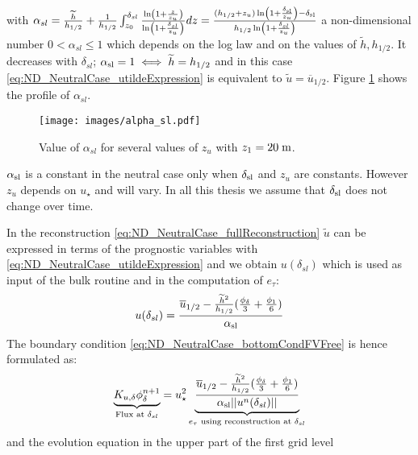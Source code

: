 with $\alpha_{sl} =
\frac{\widetilde{h}}{{h_{1/2}}} + \frac{1}{{h_{1/2}}}\int_{z_0}^{\delta_{sl}}
\frac{\ln(1+\frac{z}{z_{u}})}{\ln(1+\frac{\delta_{sl}}{z_{u}})}dz
= \frac{(h_{1/2} + z_{u})
\ln(1+\frac{\delta_{\rm sl}}{z_{u}}) - \delta_{\rm sl}}{
	h_{1/2}\ln(1+\frac{\delta_{sl}}{z_{u}})}$ a non-dimensional
number $0 < \alpha_{sl} \leq 1$ which depends on the log law and
on the values of $\widetilde{h}, h_{1/2}$. It decreases with
$\delta_{sl}$; $\alpha_{\rm sl} = 1 \iff \widetilde{h}=h_{1/2}$
and in this case \eqref{eq:ND_NeutralCase_utildeExpression} is
equivalent to $\widetilde{u} = \overline{u}_{1/2}$.
Figure \ref{fig:ND_NeutralCase_alpha_sl} shows the
profile of $\alpha_{sl}$.
\begin{figure}
	\centering
	\texttt{[image: images/alpha\_sl.pdf]}
	\caption
	{ Value of $\alpha_{sl}$
	for several values of $z_u$ with $z_1=20\;{\rm m}$.
	}
	\label{fig:ND_NeutralCase_alpha_sl}
\end{figure}
\begin{remark}
$\alpha_{\rm sl}$ is a constant in the neutral case
only when $\delta_{\rm sl}$ and $z_{u}$ are constants. However
$z_{u}$ depends on $u_\star$ and will vary.
In all this thesis we assume that $\delta_{\rm sl}$ does not
change over time.
\end{remark}
%
In the reconstruction \eqref{eq:ND_NeutralCase_fullReconstruction}
$\widetilde{u}$ can be expressed in terms of the prognostic
variables with \eqref{eq:ND_NeutralCase_utildeExpression}
and we obtain $u(\delta_{sl})$ which is used as input
of the bulk routine and in the computation of $e_\tau$:
\begin{equation}
u(\delta_{sl})=\frac{\overline{u}_{1/2} -
	\frac{\widetilde{h}^2}{h_{1/2}}
	(\frac{\phi_{\delta}}{3} + \frac{\phi_1}{6})}
	{\alpha_{\rm sl}}
\end{equation}
The boundary condition \eqref{eq:ND_NeutralCase_bottomCondFVFree}
is hence formulated as:
\begin{equation}
	\label{eq:ND_NeutralCase_boundaryCondFVfree}
	\underbrace{K_{u,\delta} {\phi}^{n+1}_{\delta}}_{
		\text{Flux at } \delta_{sl}
	} = u_\star^2
	\underbrace{\frac{\overline{u}_{1/2} -
	\frac{\widetilde{h}^2}{h_{1/2}}
	(\frac{\phi_{\delta}}{3} + \frac{\phi_1}{6})}
	{\alpha_{\rm sl}||u^n(\delta_{sl}) ||}}_{
		e_\tau \text{ using reconstruction at } \delta_{sl}
	}
\end{equation}
and the evolution equation in the upper part of the first grid level
